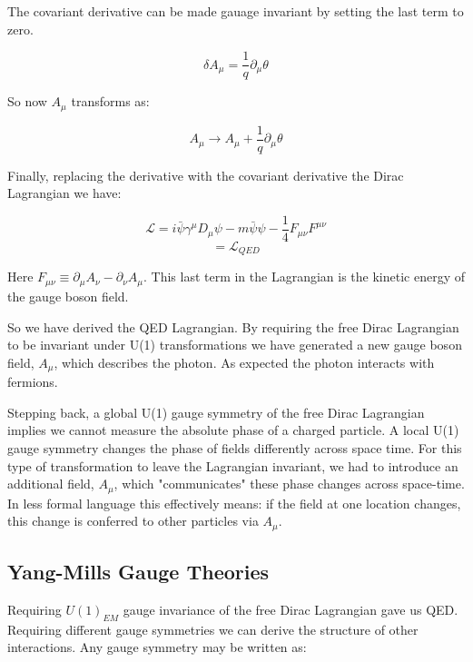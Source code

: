 The covariant derivative can be made gauage invariant by setting the last term to zero.

\begin{equation}
\delta A_{\mu} = \frac{1}{q}\partial_{\mu}\theta
\end{equation}

So now $A_{\mu}$ transforms as:

\begin{equation}
A_{\mu} \rightarrow A_{\mu} + \frac{1}{q}\partial_{\mu}\theta
\end{equation}

Finally, replacing the derivative with the covariant derivative the Dirac Lagrangian we have:

\begin{equation}
\mathcal{L} = i \bar{\psi}\gamma^{\mu}D_{\mu}\psi - m\bar{\psi}\psi - \frac{1}{4}F_{\mu\nu}F^{\mu\nu}
\end{equation}
\begin{equation}
=\mathcal{L}_{QED}
\end{equation}

Here $F_{\mu\nu}\equiv \partial_{\mu}A_{\nu} - \partial_{\nu}A_{\mu}$. This last term in the Lagrangian is the kinetic energy of the gauge boson field.

So we have derived the QED Lagrangian. By requiring the free Dirac Lagrangian to be invariant under U(1) transformations we have generated a new gauge boson field, $A_{\mu}$, which describes the photon. As expected the photon interacts with fermions.  

Stepping back, a global U(1) gauge symmetry of the free Dirac Lagrangian implies we cannot measure the absolute phase of a charged particle. A local U(1) gauge symmetry changes the phase of fields differently across space time. For this type of transformation to leave the Lagrangian invariant, we had to introduce an additional field, $A_{\mu}$, which "communicates" these phase changes across space-time. In less formal language this effectively means: if the field at one location changes, this change is conferred to other particles via $A_{\mu}$.

\subsection{Yang-Mills Gauge Theories}
Requiring $U(1)_{EM}$ gauge invariance of the free Dirac Lagrangian gave us QED. Requiring different gauge symmetries we can derive the structure of other interactions. Any gauge symmetry may be written as:

